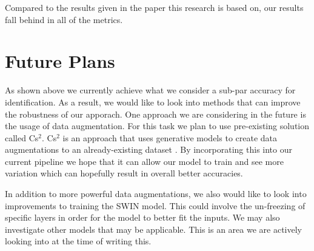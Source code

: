 \documentclass[10pt,twocolumn,letterpaper]{article}
\begin{document}
Compared to the results given in the paper this research is based on, our results fall behind in all of the metrics.   \par

\section{Future Plans}

As shown above we currently achieve what we consider a sub-par accuracy for identification. As a result, we would like to look into methods that can improve the robustness of our apporach. One approach we are considering in the future is the usage of data augmentation. For this task we plan to use pre-existing solution called Cs$^2$. Cs$^2$ is an approach that uses generative models to create data augmentations to an already-existing dataset \cite{cs2}. By incorporating this into our current pipeline we hope that it can allow our model to train and see more variation which can hopefully result in overall better accuracies.  \par

In addition to more powerful data augmentations, we also would like to look into improvements to training the SWIN model. This could involve the un-freezing of specific layers in order for the model to better fit the inputs. We may also investigate other models that may be applicable. This is an area we are actively looking into at the time of writing this. \par 










{\small


}
\end{document}
